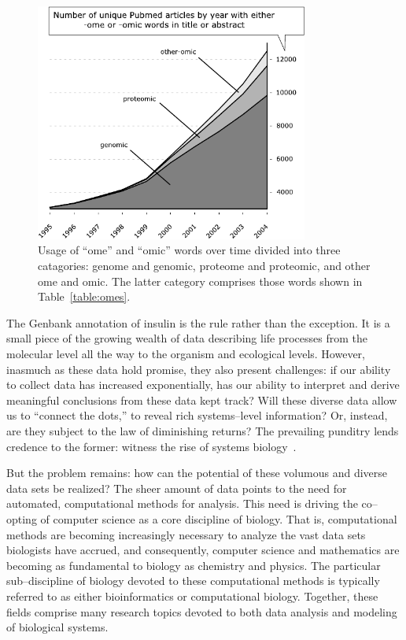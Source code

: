 \begin{figure}
    \centering
    \includegraphics[width=0.8\textwidth]{Body/Images-chap1/omes.pdf}
    \caption[Usage of ``ome'' and ``omic'' words over time]{
            Usage of ``ome'' and ``omic'' words over time divided
            into three catagories: genome and genomic, proteome
            and proteomic, and other ome and omic.  The latter
            category comprises those words shown in
            Table~\vref{table:omes}.
    }\label{fig:omes}
\end{figure}



The Genbank annotation of insulin is the rule rather than the
exception.  It is a small piece of the growing wealth of data
describing life processes from the molecular level all the way to
the organism and ecological levels.  However, inasmuch as these data
hold promise, they also present challenges: if our ability to
collect data has increased exponentially, has our ability to
interpret and derive meaningful conclusions from these data kept
track? Will these diverse data allow us to ``connect the dots,'' to
reveal rich systems--level information? Or, instead, are they
subject to the law of diminishing returns? The prevailing punditry
lends credence to the former: witness the rise of systems
biology~\cite{ideker2003building,hwang2005data,salazar2006bioinformatics}.

But the problem remains: how can the potential of these volumous and diverse data sets
be realized?  The sheer amount of data points to the need for
automated, computational methods for analysis.  This need is driving
the co--opting of computer science as a core discipline of biology.
That is, computational methods are becoming increasingly necessary
to analyze the vast data sets biologists have accrued, and
consequently, computer science and mathematics are becoming as
fundamental to biology as chemistry and physics.  The particular
sub--discipline of biology devoted to these computational methods is
typically referred to as either bioinformatics or computational
biology.  Together, these fields comprise many research topics
devoted to both data analysis and modeling of biological systems.

